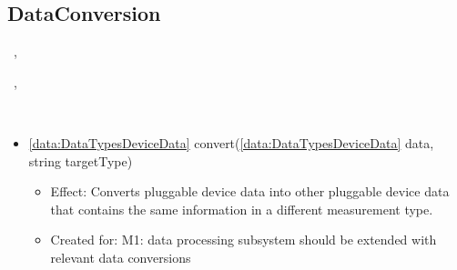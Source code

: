   \subsection{DataConversion}\label{int:OnlineServiceOnlineServiceApplicationManagerDeviceDataConverterDataConversion}
    \begin{description}
      \item[Provided by:] \iconcomponent{}~, \iconcomponent{}~
      \item[Required by:] \iconcomponent{}~, \iconcomponent{}~
      \item[Operations:] ~
    \begin{itemize}[noitemsep,nolistsep,leftmargin=-.25cm]
      \item \textsf{\ref{data:DataTypesDeviceData} convert(\ref{data:DataTypesDeviceData} data, string targetType)}
        \begin{itemize}[noitemsep,nolistsep]
           \item Effect: Converts pluggable device data into other pluggable device data that contains the same information in a different measurement type.
\item Created for: M1: data processing subsystem should be extended with relevant data conversions
        \end{itemize}
    \end{itemize}
    \end{description}


